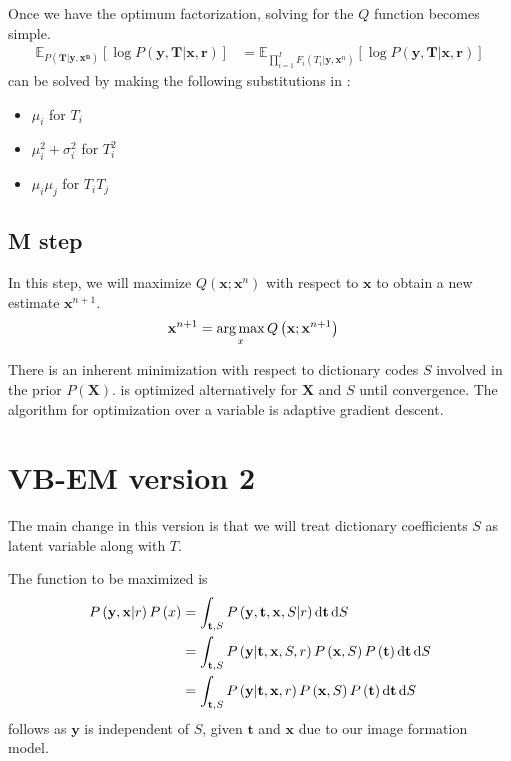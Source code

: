 Once we have the optimum factorization, solving for the $Q$ function becomes simple.
\begin{align}
    \mathbb{E}_{P( \mathbf{T} | \mathbf{y}, \mathbf{x^n})} \left[ \log P \left( \mathbf{y}, \mathbf{T} | \mathbf{x}, \mathbf{r} \right) \right] &= \mathbb{E}_{ \prod_{i=1}^{I} F_i (T_i | \mathbf{y}, \mathbf{x}^n) } \left[ \log P \left( \mathbf{y}, \mathbf{T} | \mathbf{x}, \mathbf{r} \right) \right] \label{eqn:Qsimplevbem1}
\end{align}
 can be solved by making the following substitutions in :
\begin{itemize}
    \item $\mu_i$ for $T_i$
    \item $\mu_i^2 + \sigma_i^2$ for $T_i^2$
    \item $\mu_i \mu_j$ for $T_i T_j$ 
\end{itemize}


\subsection{M step}
In this step, we will maximize $Q(\mathbf{x}; \mathbf{x}^n)$ with respect to $\mathbf{x}$ to obtain a new estimate $\mathbf{x}^{n+1}$.
\begin{align}
    \mathbf{x}^{n+1} &= \operatorname*{arg\,max}_{x} Q \left( \mathbf{x}; \mathbf{x}^{n+1} \right) \label{eqn:Mvbem1}
\end{align}

There is an inherent minimization with respect to dictionary codes $S$ involved in the prior $ P \left(\mathbf{X}\right) $.  is optimized alternatively for $\mathbf{X}$ and $S$ until convergence. The algorithm for optimization over a variable is adaptive gradient descent.

\section{VB-EM version 2}
The main change in this version is that we will treat dictionary coefficients $S$ as latent variable along with $T$.

The function to be maximized is
\begin{align}
    P \left( \mathbf{y}, \mathbf{x} | r \right) P \left( x \right) &= \int_{\mathbf{t}, S} P \left( \mathbf{y}, \mathbf{t}, \mathbf{x}, S | r \right)  \mathop{}\!\mathrm{d}\mathbf{t} \mathop{}\!\mathrm{d} S \\
    &= \int_{\mathbf{t}, S} P \left( \mathbf{y} | \mathbf{t}, \mathbf{x}, S,  r \right)  P \left(\mathbf{x}, S \right) P \left( \mathbf{t} \right) \mathop{}\!\mathrm{d}\mathbf{t} \mathop{}\!\mathrm{d} S \label{eqn:mapDerive1}\\
    &= \int_{\mathbf{t}, S} P \left( \mathbf{y} | \mathbf{t}, \mathbf{x},  r \right)  P \left(\mathbf{x}, S \right) P \left( \mathbf{t} \right) \mathop{}\!\mathrm{d}\mathbf{t} \mathop{}\!\mathrm{d} S \label{eqn:mapDerive2}
\end{align}
 follows as $\mathbf{y}$ is independent of $S$, given $\mathbf{t}$ and $\mathbf{x}$ due to our image formation model.

